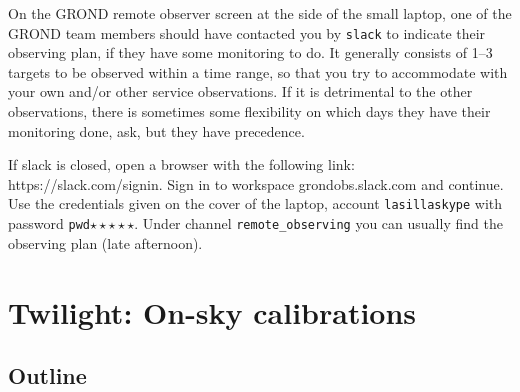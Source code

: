 \documentclass[11pt,fleqn,a4paper]{book}
\begin{document}
On the GROND remote observer screen at the side of the small laptop, one of the GROND team members should have contacted you by \texttt{slack} to indicate their observing plan, if they have some monitoring to do.  It generally consists of 1--3 targets to be observed within a time range, so that you try to accommodate with your own and/or other \gls{service} observations.  If it is detrimental to the other observations, there is sometimes some flexibility on which days they have their monitoring done, ask, but they have precedence.

If slack is closed, open a browser with the following link: https://slack.com/signin. Sign in to workspace grondobs.slack.com and continue. Use the credentials given on the cover of the laptop, account \texttt{lasillaskype} with password \texttt{pwd}$\star\star\star\star\star$. Under channel \texttt{remote\_observing} you can usually find the observing plan (late afternoon). 



\chapter{Twilight: On-sky calibrations}
\label{chap:nightcal}


\section{Outline}
\end{document}

